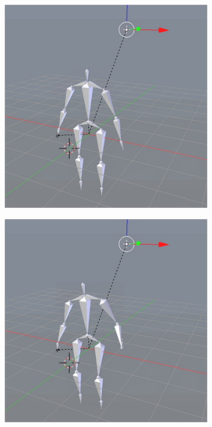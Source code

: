 \documentclass[10pt,twocolumn,letterpaper]{article}
\begin{document}
\begin{figure}[]
    \begin{subfigure}{0.2\textwidth}
        \centering
        \includegraphics[width=.9\linewidth]{raise-linear-0.jpg}
    \end{subfigure}\begin{subfigure}{0.2\textwidth}
        \centering
        \includegraphics[width=.9\linewidth]{raise-linear-1.jpg}
    \end{subfigure}\begin{subfigure}{0.2\textwidth}

\end{subfigure}
\end{figure}
\end{document}

